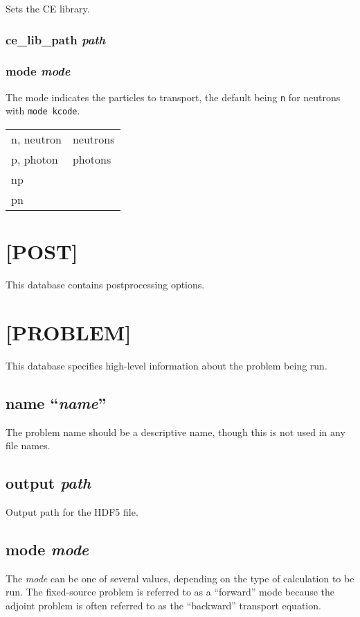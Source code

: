 \documentclass[10pt]{article}
\begin{document}
Sets the CE library.

\subsubsection{ce\_lib\_path \textit{path}}

\subsubsection{mode \textit{mode}}

The mode indicates the particles to transport, the default being \texttt{n} for neutrons with \texttt{mode kcode}.

\begin{tabular}{l l}
n, neutron & neutrons\\
p, photon & photons\\
np & \\
pn & \\
\end{tabular}

\section{[POST]}
This database contains postprocessing options.

\section{[PROBLEM]}
This database specifies high-level information about the problem being run.

\subsection{name ``\textit{name}''}
The problem name should be a descriptive name, though this is not used in any file names.

\subsection{output \textit{path}}
Output path for the HDF5 file.

\subsection{mode \textit{mode}}
The \textit{mode} can be one of several values, depending on the type of calculation to be run. The fixed-source problem is referred to as a ``forward'' mode because the adjoint problem is often referred to as the ``backward'' transport equation.\newline
\end{document}
